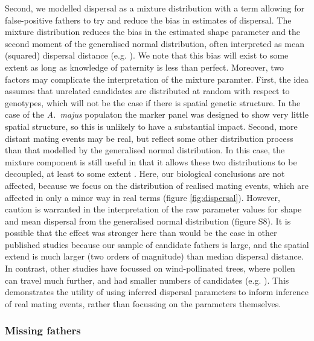 \documentclass[10pt, a4paper, twocolumn]{article} %
\begin{document}
Second, we modelled dispersal as a mixture distribution with a term allowing for false-positive fathers to try and reduce the bias in estimates of dispersal.
The mixture distribution reduces the bias in the estimated shape parameter and the second moment of the generalised normal distribution, often interpreted as mean (squared) dispersal distance (e.g. \cite{clark1998trees, austerlitz2004using, klein2008pollen}).
We note that this bias will exist to some extent as long as knowledge of paternity is less than perfect.
Moreover, two factors may complicate the interpretation of the mixture paramter.
First, the idea assumes that unrelated candidates are distributed at random with respect to genotypes, which will not be the case if there is spatial genetic structure.
In the case of the \textit{A.~majus} populaton the marker panel was designed to show very little spatial structure, so this is unlikely to have a substantial impact.
Second, more distant mating events may be real, but reflect some other distribution process than that modelled by the generalised normal distribution.
In this case, the mixture component is still useful in that it allows these two distributions to be decoupled, at least to some extent \citep{streiff1999pollen, slavov2009extensive}.
Here, our biological conclusions are not affected, because we focus on the distribution of realised mating events, which are affected in only a minor way in real terms (figure \ref{fig:dispersal}).
However, caution is warranted in the interpretation of the raw parameter values for shape and mean dispersal from the generalised normal distribution (figure S8).
It is possible that the effect was stronger here than would be the case in other published studies because our sample of candidate fathers is large, and the spatial extend is much larger (two orders of magnitude) than median dispersal distance.
In contrast, other studies have focussed on wind-pollinated trees, where pollen can travel much further, and had smaller numbers of candidates (e.g. \cite{adams1992using, austerlitz2004using, klein2008pollen}).
This demonstrates the utility of using inferred dispersal parameters to inform inference of real mating events, rather than focussing on the parameters themselves.

\subsubsection{Missing fathers}
\end{document}
